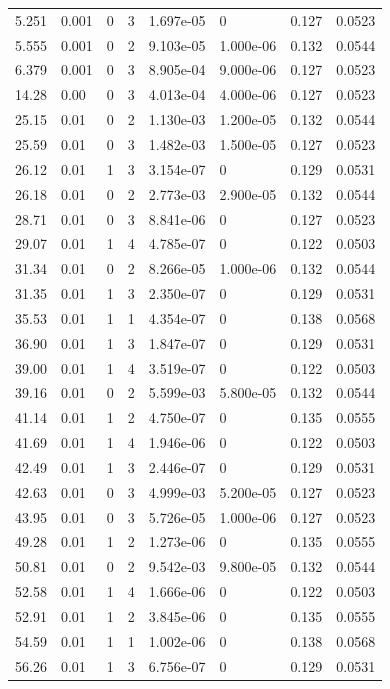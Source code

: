 \documentclass[preview]{standalone}
\begin{document}
{{\begin{tabular}{L{1.2cm}C{1.2cm} C{0.3cm}C{0.5cm} C{1.4cm}C{1.4cm} C{1.4cm}C{1.4cm}}
  5.251  &  0.001  & 0     &  3 &  1.697e-05  & 0  & 0.127 &  0.0523   \\ 
  5.555  &  0.001  & 0     &  2 &  9.103e-05  & 1.000e-06  & 0.132 &  0.0544   \\ 
  6.379  &  0.001  & 0     &  3 &  8.905e-04  & 9.000e-06  & 0.127 &  0.0523   \\ 
  14.28  &  0.00  & 0     &  3 &  4.013e-04  & 4.000e-06  & 0.127 &  0.0523   \\ 
  25.15  &  0.01  & 0     &  2 &  1.130e-03  & 1.200e-05  & 0.132 &  0.0544   \\ 
  25.59  &  0.01  & 0     &  3 &  1.482e-03  & 1.500e-05  & 0.127 &  0.0523   \\ 
  26.12  &  0.01  & 1     &  3 &  3.154e-07  & 0  & 0.129 &  0.0531   \\ 
  26.18  &  0.01  & 0     &  2 &  2.773e-03  & 2.900e-05  & 0.132 &  0.0544   \\ 
  28.71  &  0.01  & 0     &  3 &  8.841e-06  & 0  & 0.127 &  0.0523   \\ 
  29.07  &  0.01  & 1     &  4 &  4.785e-07  & 0  & 0.122 &  0.0503   \\ 
  31.34  &  0.01  & 0     &  2 &  8.266e-05  & 1.000e-06  & 0.132 &  0.0544   \\ 
  31.35  &  0.01  & 1     &  3 &  2.350e-07  & 0  & 0.129 &  0.0531   \\ 
  35.53  &  0.01  & 1     &  1 &  4.354e-07  & 0  & 0.138 &  0.0568   \\ 
  36.90  &  0.01  & 1     &  3 &  1.847e-07  & 0  & 0.129 &  0.0531   \\ 
  39.00  &  0.01  & 1     &  4 &  3.519e-07  & 0  & 0.122 &  0.0503   \\ 
  39.16  &  0.01  & 0     &  2 &  5.599e-03  & 5.800e-05  & 0.132 &  0.0544   \\ 
  41.14  &  0.01  & 1     &  2 &  4.750e-07  & 0  & 0.135 &  0.0555   \\ 
  41.69  &  0.01  & 1     &  4 &  1.946e-06  & 0  & 0.122 &  0.0503   \\ 
  42.49  &  0.01  & 1     &  3 &  2.446e-07  & 0  & 0.129 &  0.0531   \\ 
  42.63  &  0.01  & 0     &  3 &  4.999e-03  & 5.200e-05  & 0.127 &  0.0523   \\ 
  43.95  &  0.01  & 0     &  3 &  5.726e-05  & 1.000e-06  & 0.127 &  0.0523   \\ 
  49.28  &  0.01  & 1     &  2 &  1.273e-06  & 0  & 0.135 &  0.0555   \\ 
  50.81  &  0.01  & 0     &  2 &  9.542e-03  & 9.800e-05  & 0.132 &  0.0544   \\ 
  52.58  &  0.01  & 1     &  4 &  1.666e-06  & 0  & 0.122 &  0.0503   \\ 
  52.91  &  0.01  & 1     &  2 &  3.845e-06  & 0  & 0.135 &  0.0555   \\ 
  54.59  &  0.01  & 1     &  1 &  1.002e-06  & 0  & 0.138 &  0.0568   \\ 
  56.26  &  0.01  & 1     &  3 &  6.756e-07  & 0  & 0.129 &  0.0531   \\ 
\hline 
\end{tabular} 

}}
\end{document}
